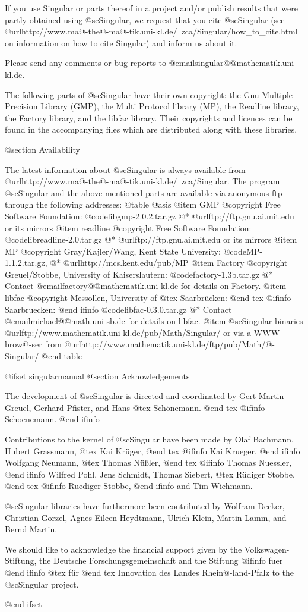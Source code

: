 If you use Singular or parts thereof in a project and/or publish
results that were partly obtained using @sc{Singular}, we request that you
cite @sc{Singular} (see
@url{http://www.ma@-the@-ma@-tik.uni-kl.de/~zca/Singular/how_to_cite.html} 
on information on how to cite Singular) and inform us about it.

Please send any comments or bug reports to
@email{singular@@mathematik.uni-kl.de}.

The following parts of @sc{Singular} have their own copyright: the Gnu Multiple
Precision Library (GMP), the Multi Protocol library (MP), the Readline library,
the Factory library, and the libfac library.
Their copyrights and licences can be found in the accompanying files
which are distributed along with these libraries.

@section Availability

The latest information about @sc{Singular} is always available from
@url{http://www.ma@-the@-ma@-tik.uni-kl.de/~zca/Singular}.
The program @sc{Singular} and the above mentioned parts are available via
anonymous ftp through the following addresses:
@table @asis
@item GMP
@copyright{} Free Software Foundation:
@code{libgmp-2.0.2.tar.gz}
@* @url{ftp://ftp.gnu.ai.mit.edu} or its mirrors
@item readline
@copyright{} Free Software Foundation:
@code{libreadline-2.0.tar.gz}
@* @url{ftp://ftp.gnu.ai.mit.edu} or its mirrors
@item MP
@copyright{} Gray/Kajler/Wang, Kent State University:
@code{MP-1.1.2.tar.gz},
@* @url{http://mcs.kent.edu/pub/MP}
@item Factory
@copyright{} Greuel/Stobbe, University of Kaiserslautern:
@code{factory-1.3b.tar.gz}
@* Contact @email{factory@@mathematik.uni-kl.de} for details on Factory.
@item libfac
@copyright{}  Messollen, University of 
@tex
Saarbr\"ucken:
@end tex
@ifinfo
Saarbruecken:
@end ifinfo
@code{libfac-0.3.0.tar.gz}
@* Contact @email{michael@@math.uni-sb.de} for details on libfac.
@item @sc{Singular} binaries
@url{ftp://www.mathematik.uni-kl.de/pub/Math/Singular/} or via a
WWW brow@-ser from
@url{http://www.mathematik.uni-kl.de/ftp/pub/Math/@-Singular/}
@end table

@ifset singularmanual
@section Acknowledgements

The development of @sc{Singular} is directed and coordinated by
Gert-Martin Greuel, Gerhard Pfister, and Hans
@tex
Sch\"onemann.
@end tex
@ifinfo
Schoenemann.
@end ifinfo

Contributions to the kernel of @sc{Singular} have been made by
Olaf Bachmann,
Hubert Grassmann,
@tex
Kai Kr\"uger,
@end tex
@ifinfo
Kai Krueger,
@end ifinfo
Wolfgang Neumann,
@tex
Thomas N\"u{\ss}ler,
@end tex
@ifinfo
Thomas Nuessler,
@end ifinfo
Wilfred Pohl,
Jens Schmidt,
Thomas Siebert,
@tex
R\"udiger Stobbe,
@end tex
@ifinfo
Ruediger Stobbe,
@end ifinfo
and
Tim Wichmann.

@sc{Singular} libraries have furthermore been contributed by 
Wolfram Decker,
Christian Gorzel,
Agnes Eileen Heydtmann,
Ulrich Klein,
Martin Lamm,
and
Bernd Martin.

We should like to acknowledge the financial support given by
the Volkswagen-Stiftung,
the Deutsche Forschungsgemeinschaft
and the Stiftung
@ifinfo
fuer
@end ifinfo
@tex
f\"ur
@end tex
Innovation des Landes Rhein@-land-Pfalz
to the
@sc{Singular} project.

@end ifset
